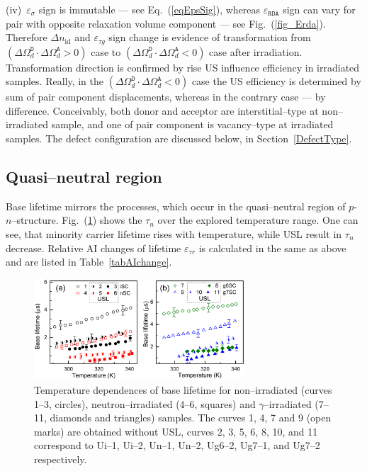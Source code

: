 \documentclass[aip,jap, amsmath,amssymb,reprint]{revtex4-1}
\begin{document}
\noindent
(iv)~$\varepsilon_{\sigma}$ sign is immutable --- see Eq.~(\ref{eqEpsSig}),
whereas $\varepsilon_{\mathtt{RDA}}$ sign can vary for pair with opposite relaxation volume component --- see Fig.~(\ref{fig_Erda}).
Therefore $\Delta n_{\mathrm{id}}$ and $\varepsilon_{\tau g}$ sign change is evidence of transformation
from $(\Delta\Omega_d^\mathtt{D}\cdot\Delta\Omega_d^\mathtt{A}>0)$  case to
$(\Delta\Omega_d^\mathtt{D}\cdot\Delta\Omega_d^\mathtt{A}<0)$ case after irradiation.
Transformation direction is confirmed by rise US influence efficiency in irradiated samples.
Really, in the $(\Delta\Omega_d^\mathtt{D}\cdot\Delta\Omega_d^\mathtt{A}<0)$ case the US efficiency is determined by sum of pair component displacements,
whereas in the contrary case  --- by difference.
Conceivably, both donor and acceptor are interstitial--type at non--irradiated sample, and one of pair component is vacancy--type at irradiated samples.
The defect configuration are discussed below, in Section~\ref{DefectType}.


\subsection{Quasi--neutral region\label{Base}}

Base lifetime mirrors the processes, which occur in the quasi--neutral region  of $p$-$n$--structure.
Fig.~(\ref{fig_TAUr}) shows the  $\tau_n$  over the explored temperature range.
One can see, that minority carrier lifetime rises with temperature,
while USL result in $\tau_n$ decrease.
Relative AI changes of lifetime $\varepsilon_{\tau r}$ is calculated in the same as above
and are listed in Table~\ref{tabAIchange}.

\begin{figure}
\includegraphics[width=0.7\textwidth]{olikhFig6}%
\caption{\label{fig_TAUr}
Temperature dependences of base lifetime for non--irradiated (curves 1--3, circles),
neutron--irradiated (4--6, squares) and $\gamma$--irradiated (7--11, diamonds and triangles) samples.
The curves 1, 4, 7 and 9 (open marks) are obtained without USL,
curves 2, 3, 5, 6, 8, 10, and 11 correspond to
Ui--1, Ui--2, Un--1, Un--2, Ug6--2, Ug7--1, and Ug7--2 respectively.
}%
\end{figure}
\end{document}
